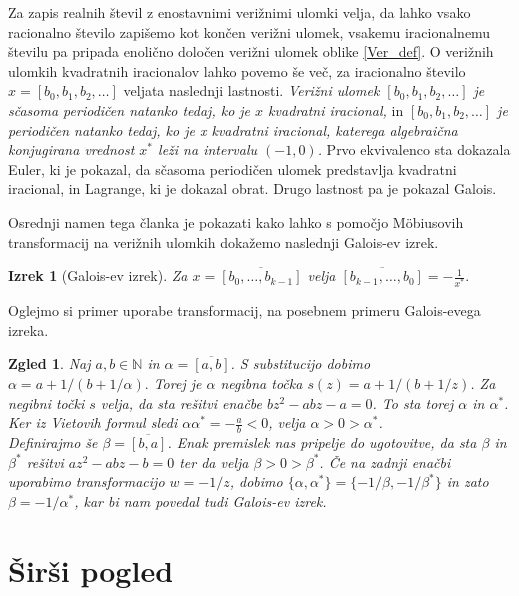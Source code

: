 \documentclass[a4paper,12pt]{article}
\def\N{\mathbb{N}} %
\newtheorem{izrek}{Izrek}
\newtheorem{zgled}{Zgled}
\begin{document}
Za zapis realnih števil z enostavnimi verižnimi ulomki velja, da lahko vsako racionalno število zapišemo kot končen verižni ulomek, vsakemu iracionalnemu številu pa pripada enolično določen verižni ulomek oblike \eqref{Ver_def}. O verižnih ulomkih kvadratnih iracionalov lahko povemo še več, za iracionalno število $x = [b_0, b_1, b_2, \ldots]$ veljata naslednji lastnosti. \emph{Verižni ulomek $[b_0, b_1, b_2, \ldots]$ je sčasoma periodičen natanko tedaj, ko je $x$ kvadratni iracional,} in \emph{$[b_0, b_1, b_2, \ldots]$ je periodičen natanko tedaj, ko je x kvadratni iracional, katerega algebraična konjugirana vrednost $x^*$ leži na intervalu $(-1, 0)$.} Prvo ekvivalenco sta dokazala Euler, ki je pokazal, da sčasoma periodičen ulomek predstavlja kvadratni iracional, in Lagrange, ki je dokazal obrat. Drugo lastnost pa je pokazal Galois.

Osrednji namen tega članka je pokazati kako lahko s pomočjo M\"{o}biusovih transformacij na verižnih ulomkih dokažemo naslednji Galois-ev izrek.

\begin{izrek}[Galois-ev izrek]
    \label{Galois}
	Za $x = \overline{[b_0, \ldots, b_{k-1}]}$ velja $\overline{[b_{k-1}, \ldots, b_0]} = - \frac{1}{x^*}.$
\end{izrek}

Oglejmo si primer uporabe transformacij, na posebnem primeru Galois-evega izreka.

\begin{zgled}
Naj $a, b \in \N$ in $\alpha = \overline{[a, b]}$. S substitucijo dobimo $\alpha = a + 1/(b + 1/\alpha).$ Torej je $\alpha$ negibna točka $s(z) = a + 1/(b + 1/z)$. Za negibni točki $s$ velja, da sta rešitvi enačbe $bz^2 - abz - a = 0$. To sta torej $\alpha$ in $\alpha^*$. Ker iz Vietovih formul sledi $\alpha\alpha^* = - \frac{a}{b} < 0$, velja $\alpha > 0 > \alpha^*$.  \\
Definirajmo še $\beta = \overline{[b, a]}$. Enak premislek nas pripelje do ugotovitve, da sta $\beta$ in $\beta^*$ rešitvi $az^2 - abz - b =0$ ter da velja $\beta > 0 > \beta^*$. Če na zadnji enačbi uporabimo transformacijo $w = - 1 / z$, dobimo $\{\alpha, \alpha^*\} = \{-1/\beta, -1/\beta^*\}$ in zato $\beta = -1/\alpha^*$, kar bi nam povedal tudi Galois-ev izrek.
\end{zgled}




\section{Širši pogled}
\label{sirse}
\end{document}
